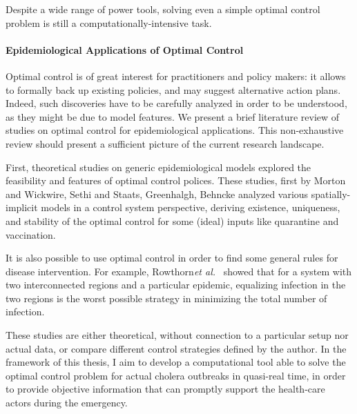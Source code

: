 Despite a wide range of power tools, solving even a simple  optimal control problem is still a computationally-intensive task.

\paragraph{Epidemiological Applications of Optimal Control}

Optimal control is of great interest for practitioners and policy makers: it allows to formally back up existing policies, and may suggest alternative action plans. Indeed, such discoveries have to be carefully analyzed in order to be understood, as they might be due to model features. We present a brief literature review of studies on optimal control for epidemiological applications. This non-exhaustive review should present a sufficient picture of the current research landscape.

First, theoretical studies\cite{kar_stability_2011, laguzet_global_2015} on  generic epidemiological models explored the feasibility and features of optimal control polices. These studies, first by Morton and Wickwire\cite{morton_optimal_1974}, Sethi and Staats\cite{sethi_optimal_1978}, Greenhalgh\cite{greenhalgh_results_1988}, Behncke\cite{behncke_optimal_2001} analyzed  various spatially-implicit models in a control system perspective, deriving existence, uniqueness, and stability of the optimal control for some (ideal) inputs like quarantine and vaccination.

It is also possible to use optimal control in order to find some general rules for disease intervention. For example, Rowthorn\textit{et al.}~\cite{rowthorn_optimal_2009} showed that for a system with two interconnected regions and a particular epidemic, equalizing infection in the two regions is the worst possible strategy in minimizing the total number of infection.

These studies are either theoretical, without connection to a particular setup nor actual data, or compare different control strategies defined by the author. In the framework of this thesis, I aim to develop a computational tool able to solve the optimal control problem for actual cholera outbreaks in quasi-real time, in order to provide objective information that can promptly support the health-care actors during the emergency. 


